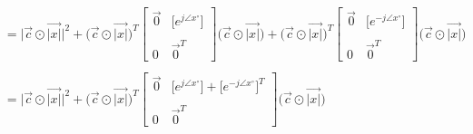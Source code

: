 \documentclass{article}
\begin{document}
\begin{align*}
                           &= \Big|\vec{c} \odot \vec{|x|}\Big|^{2} +
                              \Big(\vec{c} \odot \vec{|x|}\Big)^{T}\begin{bmatrix}
                                                                        \vec{0} & \big[e^{j\angle{x}^{\circ}}\big] \\ \\
                                                                        0 & \vec{0}^{T}
                                                                     \end{bmatrix}\Big(\vec{c} \odot \vec{|x|}\Big) +
                              \Big(\vec{c} \odot \vec{|x|}\Big)^{T}\begin{bmatrix}
                                                                        \vec{0} & \big[e^{-j\angle{x}^{\circ}}\big] \\ \\
                                                                        0 & \vec{0}^{T}
                                                                     \end{bmatrix}\Big(\vec{c} \odot \vec{|x|}\Big) \\ \\
                           &= \Big|\vec{c} \odot \vec{|x|}\Big|^{2} +
                              \Big(\vec{c} \odot \vec{|x|}\Big)^{T}\begin{bmatrix}
                                                                        \vec{0} & \big[e^{j\angle{x}^{\circ}}\big] + \big[e^{-j\angle{x}^{\circ}}\big]^{T} \\ \\
                                                                        0 & \vec{0}^{T}
                                                                     \end{bmatrix}\Big(\vec{c} \odot \vec{|x|}\Big)
\end{align*}
\end{document}
